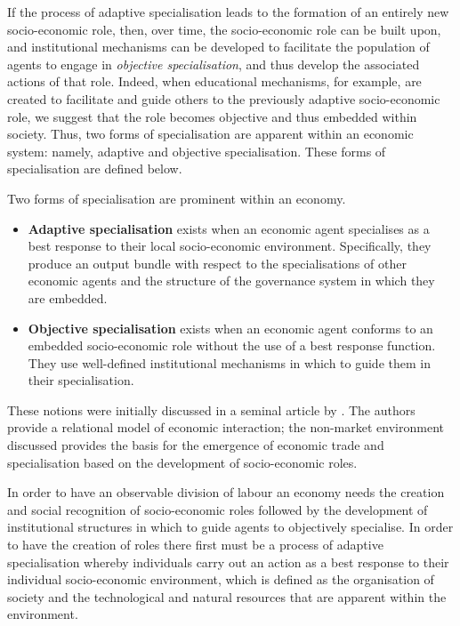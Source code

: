 If the process of adaptive specialisation leads to the formation of an entirely new socio-economic role, then, over time, the socio-economic role can be built upon, and institutional mechanisms can be developed to facilitate the population of agents to engage in \emph{objective specialisation}, and thus develop the associated actions of that role. Indeed, when educational mechanisms, for example, are created to facilitate and guide others to the previously adaptive socio-economic role, we suggest that the role becomes objective and thus embedded within society. Thus, two forms of specialisation are apparent within an economic system: namely, adaptive and objective specialisation. These forms of specialisation are defined below.
\begin{definition} \label{formsofspec}
Two forms of specialisation are prominent within an economy.
\begin{itemize}
\item \textbf{Adaptive specialisation} exists when an economic agent specialises as a best response to their local socio-economic environment. Specifically, they produce an output bundle with respect to the specialisations of other economic agents and the structure of the governance system in which they are embedded.

\item \textbf{Objective specialisation} exists when an economic agent conforms to an embedded socio-economic role without the use of a best response function. They use well-defined institutional mechanisms in which to guide them in their specialisation.
\end{itemize}
\end{definition}
These notions were initially discussed in a seminal article by \citet{GillesLazarovaRuys2007}. The authors provide a relational model of economic interaction; the non-market environment discussed provides the basis for the emergence of economic trade and specialisation based on the development of socio-economic roles.

In order to have an observable division of labour an economy needs the creation and social recognition of socio-economic roles followed by the development of institutional structures in which to guide agents to objectively specialise. In order to have the creation of roles there first must be a process of adaptive specialisation whereby individuals carry out an action as a best response to their individual socio-economic environment, which is defined as the organisation of society and the technological and natural resources that are apparent within the environment. 

